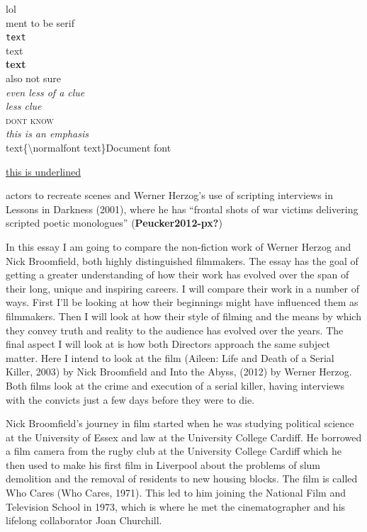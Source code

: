 \documentclass[
  12pt,
]{book}
\begin{document}
\textrm{lol }\\
\textsf{ment to be serif }\\
\texttt{text }\\
\textmd{text }\\
\textbf{text }\\
\textup{also not sure }\\
\textit{even less of a clue }\\
\textsl{less clue }\\
\textsc{dont know }\\
\emph{this is an emphasis }\\
\textnormal{text}\{\textbackslash normalfont text\}Document font

\underline{this is underlined }

actors to recreate scenes and Werner Herzog's use of scripting interviews in Lessons in Darkness (2001), where he has ``frontal shots of war victims delivering scripted poetic monologues'' (\textbf{Peucker2012-px?})

In this essay I am going to compare the non-fiction work of Werner Herzog and Nick Broomfield, both highly distinguished filmmakers. The essay has the goal of getting a greater understanding of how their work has evolved over the span of their long, unique and inspiring careers. I will compare their work in a number of ways. First I'll be looking at how their beginnings might have influenced them as filmmakers. Then I will look at how their style of filming and the means by which they convey truth and reality to the audience has evolved over the years. The final aspect I will look at is how both Directors approach the same subject matter. Here I intend to look at the film (Aileen: Life and Death of a Serial Killer, 2003) by Nick Broomfield and Into the Abyss, (2012) by Werner Herzog. Both films look at the crime and execution of a serial killer, having interviews with the convicts just a few days before they were to die.

Nick Broomfield's journey in film started when he was studying political science at the University of Essex and law at the University College Cardiff. He borrowed a film camera from the rugby club at the University College Cardiff which he then used to make his first film in Liverpool about the problems of slum demolition and the removal of residents to new housing blocks. The film is called Who Cares (Who Cares, 1971). This led to him joining the National Film and Television School in 1973, which is where he met the cinematographer and his lifelong collaborator Joan Churchill.
\end{document}
